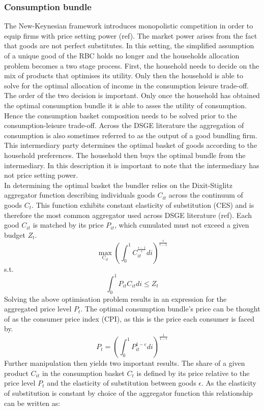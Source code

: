 \documentclass[12pt,a4paper,english]{article} %
\begin{document}
	\subsubsection{Consumption bundle}
	The New-Keynesian framework introduces monopolistic competition in order to equip firms with price setting power (ref). The market power arises from the fact that goods are not perfect substitutes. In this setting, the simplified assumption of a unique good of the RBC holds no longer and the households allocation problem becomes a two stage process. First, the household needs to decide on the mix of products that optimises its utility. Only then the household is able to solve for the optimal allocation of income in the consumption leisure trade-off. The order of the two decision is important. Only once the household has obtained the optimal consumption bundle it is able to asses the utility of consumption. Hence the consumption basket composition needs to be solved prior to the consumption-leisure trade-off. Across the DSGE literature the aggregation of consumption is also sometimes referred to as the output of a good bundling firm. This intermediary party determines the optimal basket of goods according to the household preferences. The household then buys the optimal bundle from the intermediary. In this description it is important to note that the intermediary has not price setting power.\\
	In determining the optimal basket the bundler relies on the Dixit-Stiglitz aggregator function describing individuals goods $C_{it}$ across the continuum of goods $C_t$. This function exhibits constant elasticity of substitution (CES) and is therefore the most common aggregator used across DSGE literature (ref). Each good $C_{it}$ is matched by its price $P_{it}$, which cumulated must not exceed a given budget $Z_t$.
	\[
		\max_{C_{it}} \left(
							\int_{0}^{1} C_{it}^{ \frac{\epsilon - 1}{\epsilon} } di 
					\right)^{ \frac{\epsilon}{\epsilon - 1} }
	\]
	s.t.
	\[
		\int_{0}^{1} P_{it} C_{it} di \leq Z_t
	\]
	Solving the above optimisation problem results in an expression for the aggregated price level $P_t$. The optimal consumption bundle's price can be thought of as the consumer price index (CPI), as this is the price each consumer is faced by.
	\begin{equation} \label{eq:1}
			P_t = \left(
						\int_{0}^{1} P_{it}^{ 1 - \epsilon } di 
					\right)^{ \frac{1}{1 - \epsilon} }
	\end{equation}
	Further manipulation then yields two important results. The share of a given product $C_{it}$ in the consumption basket $C_t$ is defined by its price relative to the price level $P_t$ and the elasticity of substitution between goods $\epsilon$. As the elasticity of substitution is constant by choice of the aggregator function this relationship can be written as: 
\end{document}
